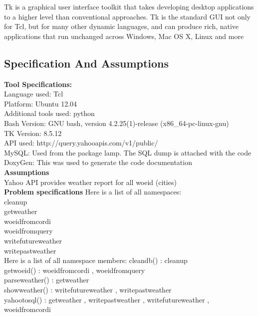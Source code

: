 \documentclass[paper=a4, fontsize=11pt]{scrartcl} %
\numberwithin{equation}{section} %
\numberwithin{figure}{section} %
\numberwithin{table}{section} %
\begin{document}
Tk is a graphical user interface toolkit that takes developing desktop applications to a higher level than conventional approaches. Tk is the standard GUI not only for Tcl, but for many other dynamic languages, and can produce rich, native applications that run unchanged across Windows, Mac OS X, Linux and more\\

\subsection{Specification And Assumptions}
{\textbf {Tool Specifications:}}\\
Language used: Tcl\\
Platform: Ubuntu 12.04\\
Additional tools used: python\\
Bash Version: GNU bash, version 4.2.25(1)-release (x86\_64-pc-linux-gnu)\\
TK Version: 8.5.12\\
API used: http://query.yahooapis.com/v1/public/\\
MySQL: Used from the package lamp. The SQL dump is attached with the code\\
DoxyGen: This was used to generate the code documentation\\

{\textbf{Assumptions}}\\
Yahoo API provides weather report for all woeid (cities)\\

\textbf{Problem specifications}
Here is a list of all namespaces:\\
cleanup	\\
getweather	\\
woeidfromcordi	\\
woeidfromquery	\\
writefutureweather	\\
writepastweather	\\

Here is a list of all namespace members:
cleandb() : cleanup \\
getwoeid() : woeidfromcordi , woeidfromquery\\
parseweather() : getweather\\
showweather() : writefutureweather , writepastweather\\
yahootosql() : getweather , writepastweather , writefutureweather , woeidfromcordi\\
\end{document}
